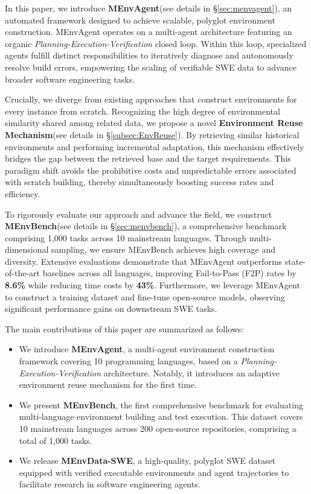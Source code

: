 \documentclass{article}
\theoremstyle{plain}
\theoremstyle{definition}
\theoremstyle{remark}
\begin{document}
In this paper, we introduce \textbf{MEnvAgent}(see details in \S \ref{sec:menvagent}), an automated framework designed to achieve scalable, polyglot environment construction. MEnvAgent operates on a multi-agent architecture featuring an organic \textit{Planning-Execution-Verification} closed loop. Within this loop, specialized agents fulfill distinct responsibilities to iteratively diagnose and autonomously resolve build errors, empowering the scaling of verifiable SWE data to advance broader software engineering tasks.

Crucially, we diverge from existing approaches that construct environments for every instance from scratch. Recognizing the high degree of environmental similarity shared among related data, we propose a novel \textbf{Environment Reuse Mechanism}(see details in \S \ref{subsec:EnvReuse}). By retrieving similar historical environments and performing incremental adaptation, this mechanism effectively bridges the gap between the retrieved base and the target requirements. This paradigm shift avoids the prohibitive costs and unpredictable errors associated with scratch building, thereby simultaneously boosting success rates and efficiency.

To rigorously evaluate our approach and advance the field, we construct \textbf{MEnvBench}(see details in \S \ref{sec:menvbench}), a comprehensive benchmark comprising 1,000 tasks across 10 mainstream languages. Through multi-dimensional sampling, we ensure MEnvBench achieves high coverage and diversity. Extensive evaluations demonstrate that MEnvAgent outperforms state-of-the-art baselines across all languages, improving Fail-to-Pass (F2P) rates by \textbf{8.6\%} while reducing time costs by\textbf{ 43\%}. Furthermore, we leverage MEnvAgent to construct a training dataset and fine-tune open-source models, observing significant performance gains on downstream SWE tasks.

The main contributions of this paper are summarized as follows:
\begin{itemize}[leftmargin=13pt, topsep=0pt, itemsep=0pt, parsep=3pt] 
    \item We introduce \textbf{MEnvAgent}, a multi-agent environment construction framework covering 10 programming languages, based on a \textit{Planning-Execution-Verification} architecture. Notably, it introduces an adaptive environment reuse mechanism for the first time.
    \item We present \textbf{MEnvBench}, the first comprehensive benchmark for evaluating multi-language environment building and test execution. This dataset covers 10 mainstream languages across 200 open-source repositories, comprising a total of 1,000 tasks.
    \item We release \textbf{MEnvData-SWE}, a high-quality, polyglot SWE dataset equipped with verified executable environments and agent trajectories to facilitate research in software engineering agents.
\end{itemize}
\end{document}
